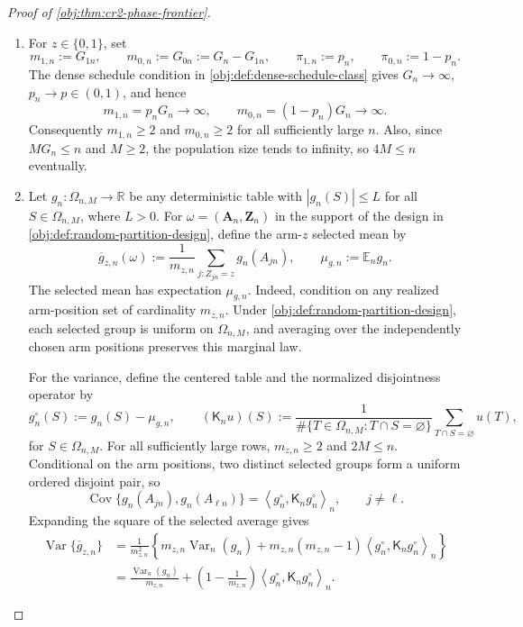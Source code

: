 \documentclass[11pt]{article}
\begin{document}
\begin{proof}[Proof of \cref{obj:thm:cr2-phase-frontier}]
\begin{enumerate}
\item For \(z\in\{0,1\}\), set
\[
m_{1,n}:=G_{1n},\qquad m_{0,n}:=G_{0n}:=G_n-G_{1n},
\qquad
\pi_{1,n}:=p_n,\qquad \pi_{0,n}:=1-p_n .
\]
The dense schedule condition in \cref{obj:def:dense-schedule-class} gives \(G_n\to\infty\), \(p_n\to p\in(0,1)\), and hence
\[
m_{1,n}=p_nG_n\to\infty,
\qquad
m_{0,n}=(1-p_n)G_n\to\infty .
\]
Consequently \(m_{1,n}\ge2\) and \(m_{0,n}\ge2\) for all sufficiently large \(n\). Also, since \(MG_n\le n\) and \(M\ge2\), the population size tends to infinity, so \(4M\le n\) eventually. %

\item Let \(g_n:\Omega_{n,M}\to\mathbb R\) be any deterministic table with \(|g_n(S)|\le L\) for all \(S\in\Omega_{n,M}\), where \(L>0\). For \(\omega=(\mathbf A_n,\mathbf Z_n)\) in the support of the design in \cref{obj:def:random-partition-design}, define the arm-\(z\) selected mean by
\[
\overline g_{z,n}(\omega)
:=
\frac{1}{m_{z,n}}\sum_{j:Z_{jn}=z} g_n(A_{jn}),
\qquad
\mu_{g,n}:=\mathbb E_n g_n .
\]
The selected mean has expectation \(\mu_{g,n}\). Indeed, condition on any realized arm-position set of cardinality \(m_{z,n}\). Under \cref{obj:def:random-partition-design}, each selected group is uniform on \(\Omega_{n,M}\), and averaging over the independently chosen arm positions preserves this marginal law.

For the variance, define the centered table and the normalized disjointness operator by
\[
g_{n}^{\circ}(S):=g_n(S)-\mu_{g,n},
\qquad
(\mathsf K_n u)(S)
:=
\frac{1}{\#\{T\in\Omega_{n,M}:T\cap S=\varnothing\}}
\sum_{T\cap S=\varnothing}u(T),
\]
for \(S\in\Omega_{n,M}\). For all sufficiently large rows, \(m_{z,n}\ge2\) and \(2M\le n\). Conditional on the arm positions, two distinct selected groups form a uniform ordered disjoint pair, so
\[
\operatorname{Cov}\{g_n(A_{jn}),g_n(A_{\ell n})\}
=
\left\langle g_{n}^{\circ},\mathsf K_n g_{n}^{\circ}\right\rangle_n,
\qquad j\ne\ell .
\]
Expanding the square of the selected average gives
\[
\begin{aligned}
\operatorname{Var}\{\overline g_{z,n}\}
&=
\frac{1}{m_{z,n}^2}
\left\{
 m_{z,n}\operatorname{Var}_n(g_n)
 +m_{z,n}(m_{z,n}-1)
 \left\langle g_{n}^{\circ},\mathsf K_n g_{n}^{\circ}\right\rangle_n
\right\} \\
&=
\frac{\operatorname{Var}_n(g_n)}{m_{z,n}}
+
\left(1-\frac{1}{m_{z,n}}\right)
\left\langle g_{n}^{\circ},\mathsf K_n g_{n}^{\circ}\right\rangle_n .
\end{aligned}
\]


\end{enumerate}
\end{proof}
\end{document}
